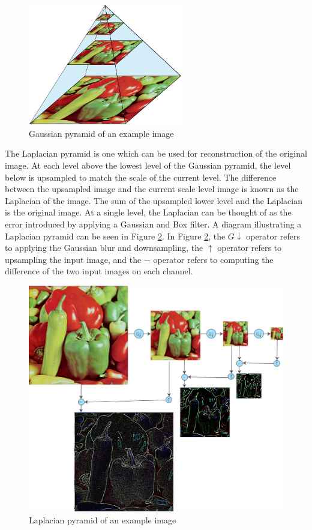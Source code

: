\documentclass{article}
\begin{document}
\begin{figure}[h]
	\centering
	\includegraphics[width=0.6\textwidth]{figures/peppers/gaussian_pyramid}
	\caption{Gaussian pyramid of an example image}
	\label{fig_pepper_gaussian_pyramid}
\end{figure}

The Laplacian pyramid is one which can be used for reconstruction of the original image. At each level above the lowest level of the Gaussian pyramid, the level below is upsampled to match the scale of the current level. The difference between the upsampled image and the current scale level image is known as the Laplacian of the image. The sum of the upsampled lower level and the Laplacian is the original image. At a single level, the Laplacian can be thought of as the error introduced by applying a Gaussian and Box filter. A diagram illustrating a Laplacian pyramid can be seen in Figure \ref{fig_pepper_laplacian_pyramid}. In Figure \ref{fig_pepper_laplacian_pyramid}, the $G\downarrow$ operator refers to applying the Gaussian blur and downsampling, the $\uparrow$ operator refers to upsampling the input image, and the $-$ operator refers to computing the difference of the two input 
images on each channel.
\begin{figure}[h]
	\centering
	\includegraphics[width=\textwidth]{figures/peppers/laplacian_pyramid}
	\caption{Laplacian pyramid of an example image}
	\label{fig_pepper_laplacian_pyramid}
\end{figure}
\end{document}
